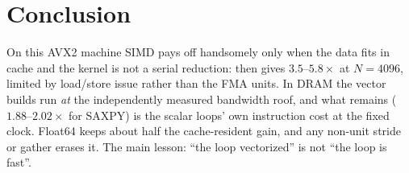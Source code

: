 \section{Conclusion}\label{sec:conclusion}

On this AVX2 machine SIMD pays off handsomely only when the data fits in cache and the kernel is
not a serial reduction:  then gives $3.5$--$5.8\times$ at $N=\num{4096}$,
limited by load/store issue rather than the FMA units. In DRAM the vector builds run \emph{at} the independently
measured bandwidth roof, and what remains ($1.88$--$2.02\times$ for SAXPY) is the scalar loops' own
instruction cost at the fixed clock. Float64 keeps about half the cache-resident gain, and any
non-unit stride or gather erases it. The main lesson: ``the loop vectorized'' is not ``the loop
is fast''.
